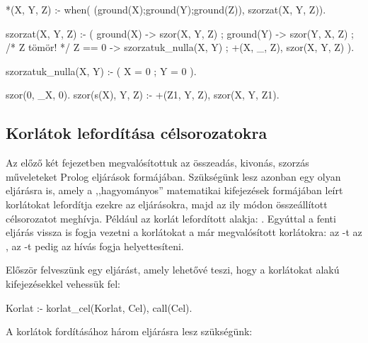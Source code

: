 \begin{prologcode}
*(X, Y, Z) :-
        when( (ground(X);ground(Y);ground(Z)),
              szorzat(X, Y, Z)).

szorzat(X, Y, Z) :-
        (   ground(X) -> szor(X, Y, Z)
        ;   ground(Y) -> szor(Y, X, Z)
        ;   /* Z tömör! */
            Z == 0 -> szorzatuk_nulla(X, Y)
        ;   +(X, _, Z),        %
            szor(X, Y, Z)
        ).

szorzatuk_nulla(X, Y) :-
        ( X = 0 ; Y = 0 ).

szor(0, _X, 0).
szor(s(X), Y, Z) :-
        +(Z1, Y, Z),
        szor(X, Y, Z1).
\end{prologcode}

\subsection{Korlátok lefordítása célsorozatokra}

Az előző két fejezetben megvalósítottuk az összeadás, kivonás, szorzás
műveleteket Prolog eljárások formájában. Szükségünk lesz azonban egy
olyan eljárásra is, amely a ,,hagyományos'' matematikai kifejezések
formájában leírt korlátokat lefordítja ezekre az eljárásokra, majd az ily
módon összeállított célsorozatot meghívja. Például az  korlát
lefordított alakja: . Egyúttal a fenti eljárás
vissza is fogja vezetni a \cd{=<, <, >=, >} korlátokat a már megvalósított
korlátokra: az -t az , az -t pedig az
 hívás fogja helyettesíteni.

Először felveszünk egy eljárást, amely lehetővé teszi, hogy a korlátokat
 alakú kifejezésekkel vehessük fel:

\begin{prologcode}
{Korlat} :- korlat_cel(Korlat, Cel), call(Cel).
\end{prologcode}

A korlátok fordításához három eljárásra lesz szükségünk:

